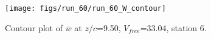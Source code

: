 \begin{figure}[H]
\centering
\texttt{[image: figs/run\_60/run\_60\_W\_contour]}
\caption{Contour plot of $\overline{w}$ at $z/c$=9.50, $V_{free}$=33.04, station 6.}
\label{fig:run_60_W_contour}
\end{figure}


